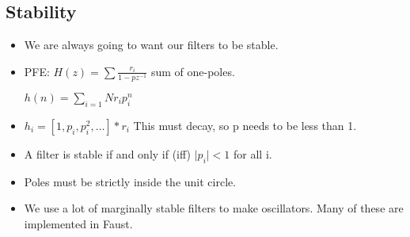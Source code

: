 \subsection*{Stability}
\begin{itemize}
\item{We are always going to want our filters to be stable.}

\item{PFE: $H(z) = \sum\frac{r_i}{1 - pz^{-1}}$ sum of one-poles. 

$h(n) = \sum\limits_{i = 1}{N} r_i p_i^n$
}
\item{
$h_i = [1, p_i, p_i^2, \dots] * r_i$
This must decay, so p needs to be less than 1.
}
\item{
A filter is stable if and only if (iff) $\vert p_i\vert  < 1$ for all i. 
}
\item{
Poles must be strictly inside the unit circle. 
}
\item{
We use a lot of marginally stable filters to make oscillators. Many of these
are implemented in Faust. 
}


\end{itemize}


